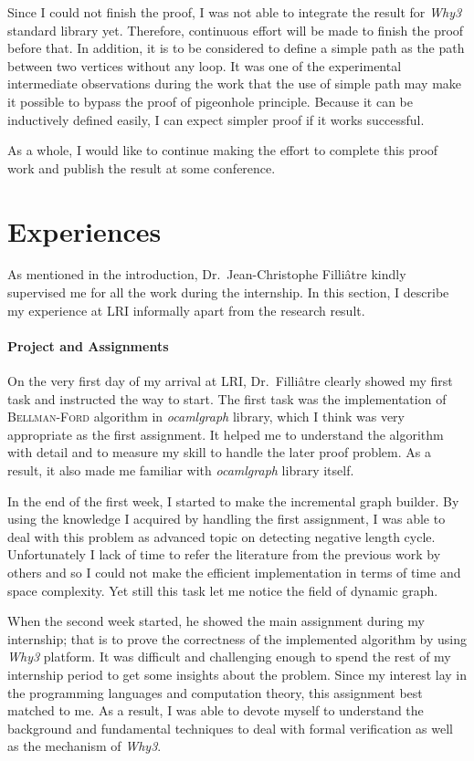 \documentclass[a4paper,10.5pt]{article}
\begin{document}
Since I could not finish the proof, I was not able to integrate the
result for \emph{Why3} standard library yet. Therefore, continuous
effort will be made to finish the proof before that. In addition, it
is to be considered to define a simple path as the path between two
vertices without any loop. It was one of the experimental intermediate
observations during the work that the use of simple path may make it
possible to bypass the proof of pigeonhole principle. Because it can
be inductively defined easily, I can expect simpler proof if it works
successful.

As a whole, I would like to continue making the effort to complete
this proof work and publish the result at some conference.

\section{Experiences}

As mentioned in the introduction, Dr.\ Jean-Christophe Filli\^atre
kindly supervised me for all the work during the internship. In this
section, I describe my experience at LRI informally apart from the
research result.

\paragraph{Project and Assignments}

On the very first day of my arrival at LRI, Dr.\ Filli\^atre clearly
showed my first task and instructed the way to start. The first task
was the implementation of \textsc{Bellman-Ford} algorithm in
\emph{ocamlgraph} library, which I think was very appropriate as the
first assignment. It helped me to understand the algorithm with detail
and to measure my skill to handle the later proof problem. As a
result, it also made me familiar with \emph{ocamlgraph} library
itself.

In the end of the first week, I started to make the incremental graph
builder. By using the knowledge I acquired by handling the first
assignment, I was able to deal with this problem as advanced topic on
detecting negative length cycle. Unfortunately I lack of time to refer
the literature from the previous work by others and so I could not
make the efficient implementation in terms of time and space
complexity. Yet still this task let me notice the field of dynamic
graph.

When the second week started, he showed the main assignment during my
internship; that is to prove the correctness of the implemented
algorithm by using \emph{Why3} platform. It was difficult and
challenging enough to spend the rest of my internship period to get
some insights about the problem.  Since my interest lay in the
programming languages and computation theory, this assignment best
matched to me. As a result, I was able to devote myself to understand
the background and fundamental techniques to deal with formal
verification as well as the mechanism of \emph{Why3}.
\end{document}
